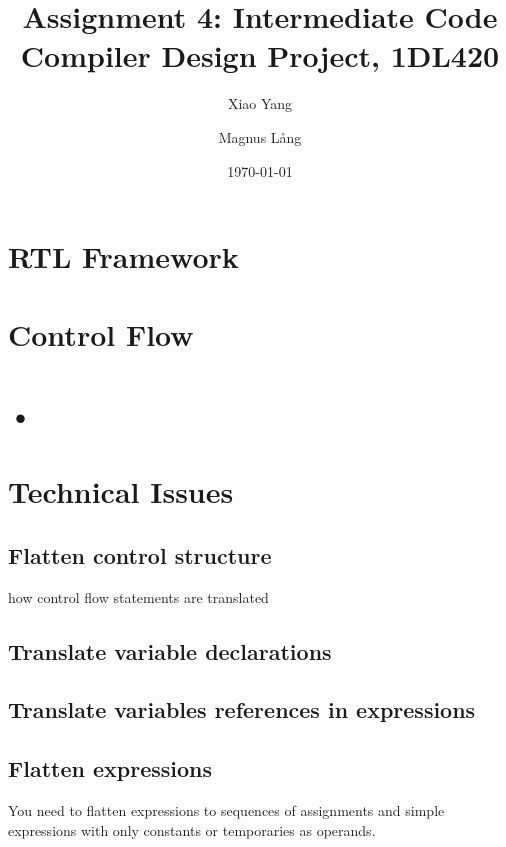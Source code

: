 \documentclass[a4paper,11pt]{article}
\title{Assignment 4: Intermediate Code \\
       Compiler Design Project, 1DL420}
\author{Xiao Yang \and Magnus L{\aa}ng} %
\date{\today}
\begin{document}
\maketitle
\section{RTL Framework}

\section{Control Flow}

\section{•}

\section{Technical Issues}
\subsection{Flatten control structure}
how control flow statements are translated

\subsection{Translate variable declarations}


\subsection{Translate variables references in expressions}

\subsection{Flatten expressions}
You need to flatten expressions to sequences of assignments and simple expressions with only constants or temporaries as operands.
\end{document}
